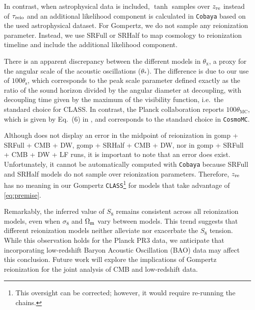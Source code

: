 In contrast, when astrophysical data is included, $\tanh$ samples over
$z_{\mathrm{re}}$ instead of $\tau_{\mathrm{reio}}$  and an additional likelihood component
is calculated in \texttt{Cobaya} based on the used astrophysical dataset. For 
Gompertz, we do not sample any reionization parameter. Instead, we 
use SRFull or SRHalf to map cosmology to reionization timeline and 
include the additional likelihood component.   

There is an apparent discrepancy between the different models in
$\theta_\mathrm{x}$, a proxy for the angular scale of the acoustic
oscillations ($\theta_*$).
The difference is due to our use of $100\theta_\mathrm{s}$, which
corresponds to the peak scale parameter defined exactly as the
ratio of the sound horizon divided by the angular diameter at
decoupling, with decoupling time given by the maximum of the visibility
function, i.e.\ the standard choice for CLASS.
In contrast, the Planck collaboration reports $100\theta_\mathrm{MC}$,
which is given by Eq.~(6) in \cite{Planck2014}, and corresponds to the
standard choice in \texttt{CosmoMC}\cite{Lewis2002}.

Although  does not display an error in the midpoint of
reionization in gomp + SRFull + CMB + DW, gomp + SRHalf + CMB + DW, 
nor in gomp + SRFull + CMB + DW + LF runs, it is important to note that 
an error does exist. Unfortunately, it cannot be automatically computed with 
\texttt{Cobaya} because SRFull and SRHalf models do not sample over
reionization parameters. Therefore, $z_{\mathrm{re}}$ has no meaning in our Gompertz
\texttt{CLASS}\footnote{This oversight can be corrected; however, it would 
require re-running the chains.} for models that take advantage 
of \cref{eq:premise}.

 Remarkably, the inferred value of $S_8$ remains consistent across all reionization
models, even when $\sigma_8$ and $\Omega_\mathrm{m}$ vary between models. This trend
suggests that different reionization models neither alleviate nor exacerbate the $S_8$
tension. While this observation holds for the Planck PR3 data, we anticipate that
incorporating low-redshift Baryon Acoustic Oscillation (BAO) data may affect this
conclusion. Future work will explore the implications of Gompertz reionization
for the joint analysis of CMB and low-redshift data.


\FloatBarrier
